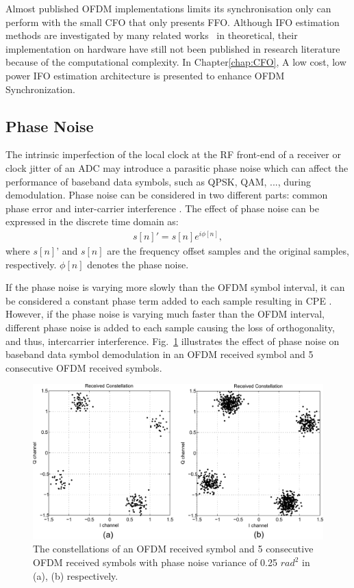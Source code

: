 Almost published OFDM implementations limits its synchronisation only can perform with the small CFO that only presents FFO.
Although IFO estimation methods are investigated by many related works~\cite{Bang2001,Park2002,Shim2006,Kim2008,Morelli2008} in theoretical, their implementation on hardware have still not been published in research literature because of the computational complexity. In Chapter\ref{chap:CFO}, A low cost, low power IFO estimation architecture is presented to enhance OFDM Synchronization. 

\subsection{Phase Noise}

The intrinsic imperfection of the local clock at the RF front-end of a receiver or clock jitter of an ADC may introduce a parasitic phase noise which can affect the performance of baseband data symbols, such as QPSK, QAM, ..., during demodulation.
Phase noise can be considered in two different parts: common phase error and inter-carrier interference \cite{Armada1998}. The effect of phase noise can be expressed in the discrete time domain as:
\begin{eqnarray}
\label{equ:}
            s[n]' = s[n] e^{i\phi[n]},
\end{eqnarray}	
where $s[n]’$ and $s[n]$ are the frequency offset samples and the original samples, respectively.
$\phi[n]$ denotes the phase noise.

If the phase noise is varying more slowly than the OFDM symbol interval, it can be considered a constant phase term added to each sample resulting in CPE \cite{Armada1998}. 
However, if the phase noise is varying much faster than the OFDM interval, different phase noise is added to each sample causing the loss of orthogonality, and thus, intercarrier interference.  
Fig.~\ref{fig:phasenoise} illustrates the effect of phase noise on baseband data symbol demodulation in an OFDM received symbol and 5 consecutive OFDM received symbols.
\begin{figure}
	\centerline{\includegraphics [width=0.8\columnwidth] {Figures/phasenoise.pdf} }
	\caption{The constellations of an OFDM received symbol and 5 consecutive OFDM received symbols with phase noise variance of 0.25 $rad^2$ in (a), (b) respectively.}
	\label{fig:phasenoise}
\end{figure}

